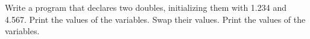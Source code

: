 Write a program that declares two doubles, initializing them with 1.234 and 4.567. Print the values of the variables. Swap their values. Print the values of the variables.

